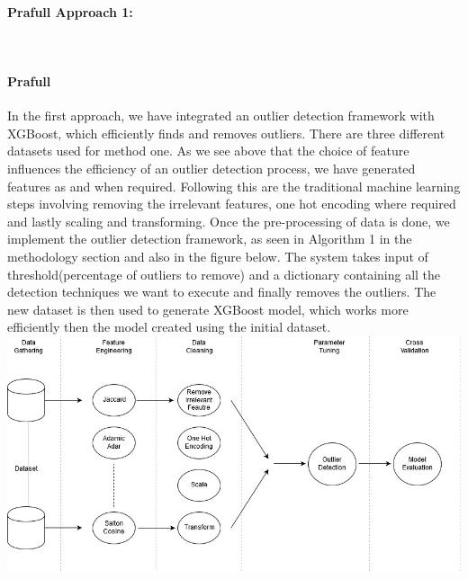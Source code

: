 \documentclass[runningheads]{llncs}
\begin{document}
\paragraph{Prafull Approach 1:} \\
\paragraph{Prafull} In the first approach, we have integrated an outlier detection framework with XGBoost, which efficiently finds and removes outliers. There are three different datasets used for method one. As we see above that the choice of feature influences the efficiency of an outlier detection process, we have generated features as and when required. Following this are the traditional machine learning steps involving removing the irrelevant features, one hot encoding where required and lastly scaling and transforming. Once the pre-processing of data is done, we implement the outlier detection framework, as seen in Algorithm 1 in the methodology section and also in the figure below. The system takes input of threshold(percentage of outliers to remove) and a dictionary containing all the detection techniques we want to execute and finally removes the outliers. The new dataset is then used to generate XGBoost model, which works more efficiently then the model created using the initial dataset. \\

\includegraphics[scale=0.4]{hld-network.jpg}\par \\

\end{document}
